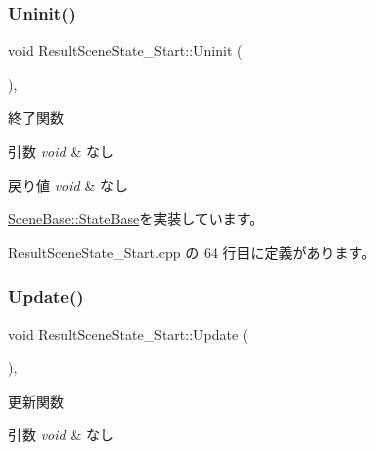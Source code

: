 \subsubsection{\texorpdfstring{Uninit()}{Uninit()}}
{\footnotesize\ttfamily void Result\+Scene\+State\+\_\+\+Start\+::\+Uninit (\begin{DoxyParamCaption}{ }\end{DoxyParamCaption})\hspace{0.3cm}{\ttfamily [override]}, {\ttfamily [virtual]}}



終了関数 


\begin{DoxyParams}{引数}
{\em void} & なし \\
\hline
\end{DoxyParams}

\begin{DoxyRetVals}{戻り値}
{\em void} & なし \\
\hline
\end{DoxyRetVals}


\mbox{\hyperlink{class_scene_base_1_1_state_base_a2763fa37e45b39bd8d3bbb735c76c59b}{Scene\+Base\+::\+State\+Base}}を実装しています。



 Result\+Scene\+State\+\_\+\+Start.\+cpp の 64 行目に定義があります。

\mbox{\label{class_result_scene_state___start_a2ecdef2bef0cd1a04055e8687e11199b}} 
\subsubsection{\texorpdfstring{Update()}{Update()}}
{\footnotesize\ttfamily void Result\+Scene\+State\+\_\+\+Start\+::\+Update (\begin{DoxyParamCaption}{ }\end{DoxyParamCaption})\hspace{0.3cm}{\ttfamily [override]}, {\ttfamily [virtual]}}



更新関数 


\begin{DoxyParams}{引数}
{\em void} & なし \\
\hline
\end{DoxyParams}

